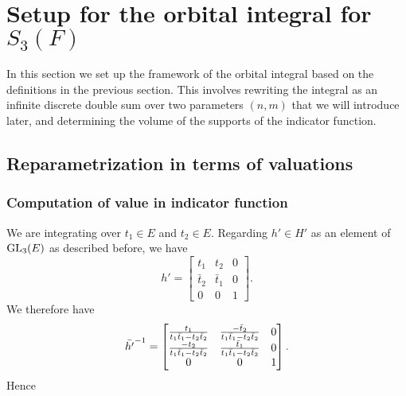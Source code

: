 \chapter{Setup for the orbital integral for $S_3(F)$}
\label{ch:orbital1}

In this section we set up the framework of the orbital integral
based on the definitions in the previous section.
This involves rewriting the integral as an infinite discrete double sum
over two parameters $(n,m)$ that we will introduce later,
and determining the volume of the supports of the indicator function.

\section{Reparametrization in terms of valuations}
\subsection{Computation of value in indicator function}
We are integrating over $t_1 \in E$ and $t_2 \in E$.
Regarding $h' \in H'$ as an element of $\operatorname{GL}_3(E)$ as described before, we have
\[ h' = \begin{bmatrix}
  t_1 & t_2 & 0  \\
  \bar t_2 & \bar t_1 & 0 \\
  0 & 0 & 1
  \end{bmatrix}. \]
We therefore have
\[ \bar{h'}^{-1} = \begin{bmatrix}
  \frac{t_1}{t_1 \bar t_1 - t_2 \bar t_2} & \frac{-\bar t_2}{t_1 \bar t_1 - t_2 \bar t_2} & 0 \\
  \frac{-t_2}{t_1 \bar t_1 - t_2 \bar t_2} & \frac{\bar t_1}{t_1 \bar t_1 - t_2 \bar t_2} & 0 \\
  0 & 0 & 1 \end{bmatrix}. \]
Hence
